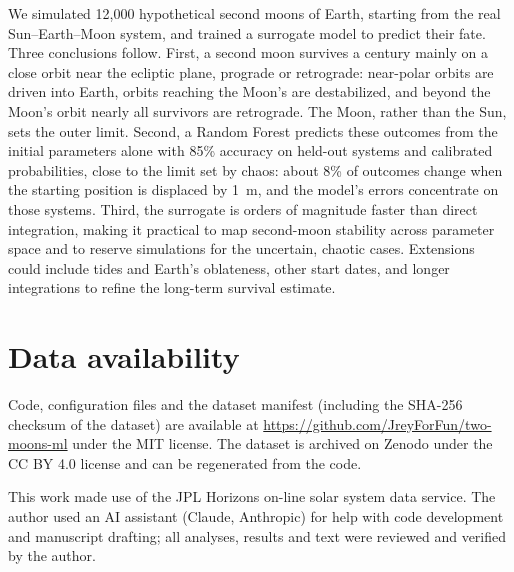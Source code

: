 \documentclass[twocolumn]{aastex631}
\begin{document}
We simulated 12,000 hypothetical second moons of Earth, starting from the real Sun--Earth--Moon
system, and trained a surrogate model to predict their fate. Three conclusions follow. First, a
second moon survives a century mainly on a close orbit near the ecliptic plane, prograde or
retrograde: near-polar orbits are driven into Earth, orbits reaching the Moon's are destabilized,
and beyond the Moon's orbit nearly all survivors are retrograde. The Moon, rather than the Sun, sets the outer limit. Second, a Random
Forest predicts these outcomes from the initial parameters alone with 85\% accuracy on held-out
systems and calibrated probabilities, close to the limit set by chaos: about 8\% of outcomes change
when the starting position is displaced by 1~m, and the model's errors concentrate on those systems.
Third, the surrogate is orders of magnitude faster than direct integration, making it practical to
map second-moon stability across parameter space and to reserve simulations for the uncertain,
chaotic cases. Extensions could include tides and Earth's oblateness, other start dates, and longer
integrations to refine the long-term survival estimate.

\section*{Data availability}

Code, configuration files and the dataset manifest (including the SHA-256 checksum of the dataset)
are available at \url{https://github.com/JreyForFun/two-moons-ml} under the MIT license. The
dataset is archived on Zenodo under the CC BY 4.0 license \citep{Quizon2026data} and can be
regenerated from the code.

\begin{acknowledgments}
This work made use of the JPL Horizons on-line solar system data service. The author used an AI
assistant (Claude, Anthropic) for help with code development and manuscript drafting; all
analyses, results and text were reviewed and verified by the author.
\end{acknowledgments}


{}

\end{document}
